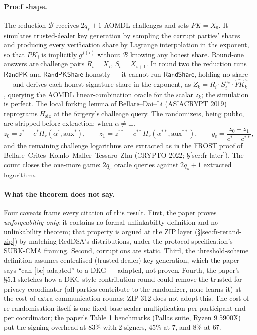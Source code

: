 \documentclass[11pt,a4paper]{article}
\theoremstyle{definition}
\begin{document}
\paragraph{Proof shape.} The reduction $\mathcal{B}$ receives
$2 q_s + 1$ AOMDL challenges and sets $PK = X_0$. It simulates
trusted-dealer key generation by sampling the corrupt parties' shares
and producing every verification share by Lagrange interpolation in the
exponent, so that $PK_i$ is implicitly $g^{f(i)}$ without $\mathcal{B}$
knowing any honest share. Round-one answers are challenge pairs
$R_i = X_i$, $S_i = X_{i+1}$. In round two the reduction runs
$\mathsf{RandPK}$ and $\mathsf{RandPKShare}$ honestly --- it cannot run
$\mathsf{RandShare}$, holding no share --- and derives each honest
signature share in the exponent, as
$Z_k = R_i \cdot S_i^{a_k} \cdot \widehat{PK}_k^{\,c}$, querying the
AOMDL linear-combination oracle for the scalar $z_k$; the simulation is
perfect. The local forking lemma of Bellare--Dai--Li (ASIACRYPT 2019)
reprograms $H_{\mathrm{sig}}$ at the forgery's challenge query. The
randomizers, being public, are stripped before extraction: when
$\alpha \ne \bot$,
\[
z_0 = z^{*} - c^{*} H_r(\alpha^{*}, \mathrm{aux}^{*}), \qquad
z_1 = z^{**} - c^{**} H_r(\alpha^{**}, \mathrm{aux}^{**}), \qquad
y_0 = \frac{z_0 - z_1}{c^{*} - c^{**}},
\]
and the remaining challenge logarithms are extracted as in the FROST
proof of Bellare--Crites--Komlo--Maller--Tessaro--Zhu (CRYPTO 2022;
\S\ref{sec:fr-later}). The count closes the one-more game: $2 q_s$
oracle queries against $2 q_s + 1$ extracted logarithms.

\paragraph{What the theorem does not say.} Four caveats frame every
citation of this result. First, the paper proves \emph{unforgeability
only}: it contains no formal unlinkability definition and no
unlinkability theorem; that property is argued at the ZIP layer
(\S\ref{sec:fr-rerand-zip}) by matching RedDSA's distributions, under
the protocol specification's SURK-CMA framing. Second, corruptions are
static. Third, the threshold-scheme definition assumes centralised
(trusted-dealer) key generation, which the paper says ``can [be]
adapted'' to a DKG --- adapted, not proven. Fourth, the paper's \S5.1
sketches how a DKG-style contribution round could remove the
trusted-for-privacy coordinator (all parties contribute to the
randomizer, none learns it) at the cost of extra communication rounds;
ZIP 312 does not adopt this. The cost of re-randomisation itself is one
fixed-base scalar multiplication per participant and per coordinator;
the paper's Table 1 benchmarks (Pallas suite, Ryzen 9 5900X) put the
signing overhead at $83\%$ with $2$ signers, $45\%$ at $7$, and $8\%$
at $67$.
\end{document}
